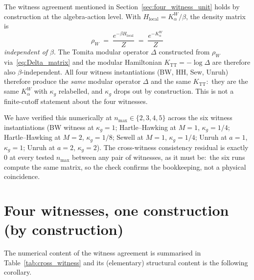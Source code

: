 \documentclass[11pt,a4paper]{article}
\theoremstyle{plain}
\theoremstyle{definition}
\newcommand{\nmax}{n_{\max}}
\newcommand{\TT}{\mathrm{TT}}
\begin{document}
The witness agreement mentioned in
Section~\ref{sec:four_witness_unit} holds by construction at the
algebra-action level. With $H_{\mathrm{local}} = K_\alpha^W / \beta$,
the density matrix is
\begin{equation}\label{eq:rho_W_beta_indep}
   \rho_W \;=\; \frac{e^{-\beta H_{\mathrm{local}}}}{Z}
            \;=\; \frac{e^{-K_\alpha^W}}{Z}
\end{equation}
\emph{independent of $\beta$}. The Tomita modular operator $\Delta$
constructed from $\rho_W$ via~\eqref{eq:Delta_matrix} and the modular
Hamiltonian $K_{\TT} = -\log \Delta$ are therefore also
$\beta$-independent. All four witness instantiations (BW, HH, Sew,
Unruh) therefore produce the \emph{same} modular operator $\Delta$ and
the same $K_{\TT}$:\ they are the same $K_\alpha^W$ with $\kappa_g$
relabelled, and $\kappa_g$ drops out by construction.  This is not a
finite-cutoff statement about the four witnesses.

We have verified this numerically at $\nmax \in \{2, 3, 4, 5\}$ across
the six witness instantiations (BW witness at $\kappa_g = 1$;
Hartle--Hawking at $M = 1$, $\kappa_g = 1/4$; Hartle--Hawking at
$M = 2$, $\kappa_g = 1/8$; Sewell at $M = 1$, $\kappa_g = 1/4$;
Unruh at $a = 1$, $\kappa_g = 1$; Unruh at $a = 2$, $\kappa_g = 2$).
The cross-witness consistency residual is exactly $0$ at every tested
$\nmax$ between any pair of witnesses, as it must be:\ the six runs
compute the same matrix, so the check confirms the bookkeeping, not a
physical coincidence.

\section{Four witnesses, one construction (by construction)}
\label{sec:four_witness_collapse}

The numerical content of the witness agreement is summarised in
Table~\ref{tab:cross_witness} and its (elementary) structural content
is the following corollary.
\end{document}
